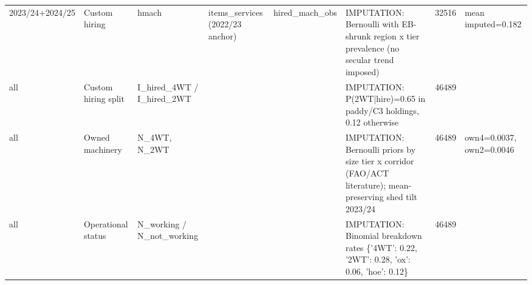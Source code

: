 \begin{tabular}{llllllrl}
 2023/24+2024/25 & Custom hiring             & hmach                     & items\_services (2022/23 anchor)  & hired\_mach\_obs                            & IMPUTATION: Bernoulli with EB-shrunk region x tier prevalence (no secular trend imposed)                     &   32516 & mean imputed=0.182                                                                             \\
 all             & Custom hiring split       & I\_hired\_4WT / I\_hired\_2WT &                                  &                                           & IMPUTATION: P(2WT|hire)=0.65 in paddy/C3 holdings, 0.12 otherwise                                            &   46489 &                                                                                                \\
 all             & Owned machinery           & N\_4WT, N\_2WT              &                                  &                                           & IMPUTATION: Bernoulli priors by size tier x corridor (FAO/ACT literature); mean-preserving shed tilt 2023/24 &   46489 & own4=0.0037, own2=0.0046                                                                       \\
 all             & Operational status        & N\_working / N\_not\_working &                                  &                                           & IMPUTATION: Binomial breakdown rates \{'4WT': 0.22, '2WT': 0.28, 'ox': 0.06, 'hoe': 0.12\}                     &   46489 &                                                                                                \\
\bottomrule
\end{tabular}